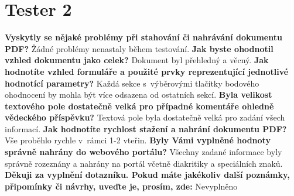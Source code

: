 \section{Tester 2}

\textbf{Vyskytly se nějaké problémy při stahování či nahrávání dokumentu PDF?}
\newline
Žádné problémy nenastaly během testování.
\newline
\newline
\textbf{Jak byste ohodnotil vzhled dokumentu jako celek?}
\newline
Dokument byl přehledný a věcný.
\newline
\newline
\textbf{Jak hodnotíte vzhled formuláře a použité prvky reprezentující jednotlivé hodnotící parametry?}
\newline
Každá sekce s~výběrovými tlačítky bodového ohodnocení by mohla být více odsazena od ostatních sekcí.
\newline
\newline
\textbf{Byla velikost textového pole dostatečně velká pro případné komentáře ohledně vědeckého příspěvku?}
\newline
Textová pole byla dostatečně velká pro zadání všech informací.
\newline
\newline
\textbf{Jak hodnotíte rychlost stažení a nahrání dokumentu PDF?} 
\newline
Vše proběhlo rychle v~rámci 1-2 vteřin.
\newline
\newline
\textbf{Byly Vámi vyplněné hodnoty správně nahrány do webového portálu?}
\newline
Všechny zadané informace byly správně rozeznány a nahrány na portál včetně diakritiky a speciálních znaků.
\newline
\newline
\textbf{Děkuji za vyplnění dotazníku. Pokud máte jakékoliv další poznámky, připomínky či návrhy, uveďte je, prosím, zde:}
\newline
Nevyplněno
\newpage 

